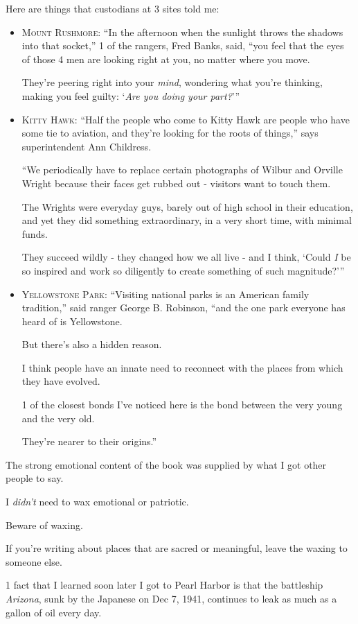 \documentclass{book}
\numberwithin{equation}{section}
\begin{document}
Here are things that custodians at 3 sites told me:
\begin{itemize}
    \item \textsc{Mount Rushmore}: ``In the afternoon when the sunlight throws the shadows into that socket,'' 1 of the rangers, Fred Banks, said, ``you feel that the eyes of those 4 men are looking right at you, no matter where you move.
    
    They're peering right into your \textit{mind}, wondering what you're thinking, making you feel guilty: `\textit{Are you doing your part?}'''
    \item \textsc{Kitty Hawk}: ``Half the people who come to Kitty Hawk are people who have some tie to aviation, and they're looking for the roots of things,'' says superintendent Ann Childress.
    
    ``We periodically have to replace certain photographs of Wilbur and Orville Wright because their faces get rubbed out - visitors want to touch them.
    
    The Wrights were everyday guys, barely out of high school in their education, and yet they did something extraordinary, in a very short time, with minimal funds.
    
    They succeed wildly - they changed how we all live - and I think, `Could \textit{I} be so inspired and work so diligently to create something of such magnitude?'''
    \item \textsc{Yellowstone Park}: ``Visiting national parks is an American family tradition,'' said ranger George B. Robinson, ``and the one park everyone has heard of is Yellowstone.
    
    But there's also a hidden reason.
    
    I think people have an innate need to reconnect with the places from which they have evolved.
    
    1 of the closest bonds I've noticed here is the bond between the very young and the very old.
    
    They're nearer to their origins.''
\end{itemize}
The strong emotional content of the book was supplied by what I got other people to say.

I \textit{didn't} need to wax emotional or patriotic.

Beware of waxing.

If you're writing about places that are sacred or meaningful, leave the waxing to someone else.

1 fact that I learned soon later I got to Pearl Harbor is that the battleship \textit{Arizona}, sunk by the Japanese on Dec 7, 1941, continues to leak as much as a gallon of oil every day.
\end{document}
